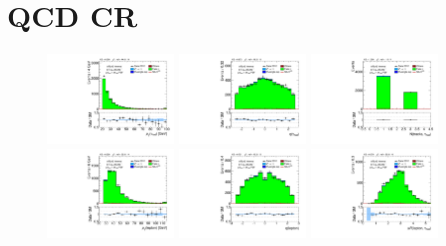 \clearpage

\section{QCD CR}

\begin{figure}[tp]
  \centering
  \includegraphics[width=0.30\textwidth]{figures/analysis/vbf-QCDCR/tau-pt}
  \includegraphics[width=0.30\textwidth]{figures/analysis/vbf-QCDCR/tau-eta}
  \includegraphics[width=0.30\textwidth]{figures/analysis/vbf-QCDCR/tau-numTrack} \\
  \includegraphics[width=0.30\textwidth]{figures/analysis/vbf-QCDCR/lep-pt-hi}
  \includegraphics[width=0.30\textwidth]{figures/analysis/vbf-QCDCR/lep-eta}
  \includegraphics[width=0.30\textwidth]{figures/analysis/vbf-QCDCR/taulep-dR} \\

\end{figure}
